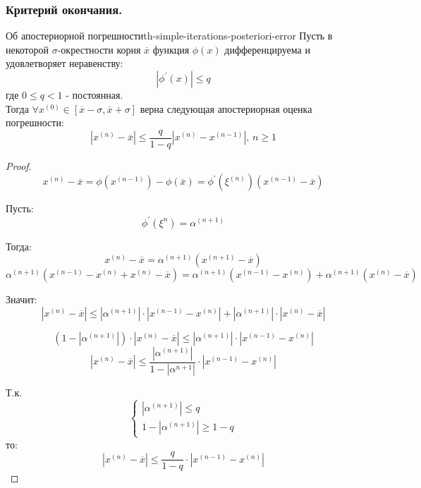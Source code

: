 \documentclass[14pt]{extarticle}
\begin{document}
    \subsubsection{Критерий окончания.}
        
        \begin{theorem}{Об апостериорной погрешности}{th-simple-iterations-posteriori-error}
            Пусть в некоторой $\sigma$-окрестности корня $\overline{x}$ функция $\phi(x)$ дифференцируема и удовлетворяет неравенству:
            $$|\phi^{'}(x)| \leq q$$
            где $0 \leq q < 1$ - постоянная.\\

            Тогда $\forall x^{(0)} \in [\overline{x} - \sigma, \overline{x} + \sigma]$ верна следующая апостериорная оценка погрешности:
            $$|x^{(n)} - \overline{x}| \leq \frac{q}{1 - q} |x^{(n)} - x^{(n - 1)}| \text{, } n \geq 1$$

            \begin{proof}
                $$x^{(n)} - \overline{x} = \phi(x^{(n - 1)}) - \phi(\overline{x}) = \phi^{'}(\xi^{(n)})(x^{(n - 1)} - \overline{x})$$

                Пусть: 
                $$\phi^{'}(\xi^{n}) = \alpha^{(n+1)}$$

                Тогда:
                $$x^{(n)} - \overline{x} = \alpha^{(n+1)}(x^{(n+1)} - \overline{x})$$
                $$\alpha^{(n + 1)}(x^{(n - 1)} - x^{(n)} + x^{(n)} - \overline{x}) = \alpha^{(n + 1)}(x^{(n - 1)} - x^{(n)}) + \alpha^{(n + 1)}(x^{(n)} - \overline{x})$$
                
                Значит:
                $$|x^{(n)} - \overline{x}| \leq |\alpha^{(n + 1)}| \cdot |x^{(n - 1)} - x^{(n)}| + |\alpha^{(n + 1)}| \cdot |x^{(n)} - \overline{x}|$$

                $$(1 - |\alpha^{(n + 1)}|) \cdot |x^{(n)} - \overline{x}| \leq |\alpha^{(n + 1)}| \cdot |x^{(n - 1)} - x^{(n)}|$$
                $$|x^{(n)} - \overline{x}| \leq \frac{|\alpha^{(n + 1)}|}{1 - |\alpha^{n + 1}|} \cdot |x^{(n - 1)} - x^{(n)}|$$

                Т.к. $$\begin{cases} 
                       |\alpha^{(n + 1)}| \leq q \\
                       1 - |\alpha^{(n + 1)}| \geq 1 - q
                       \end{cases}$$ то:
                $$|x^{(n)} - \overline{x}| \leq \frac{q}{1-q} \cdot |x^{(n - 1)} - x^{(n)}|$$
            \end{proof}
        \end{theorem}
\end{document}
